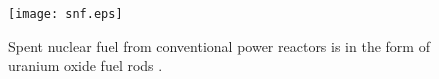 \begin{figure}[htb!]
  \begin{center}
    \texttt{[image: snf.eps]}
  \end{center}
  \caption{Spent nuclear fuel from conventional power reactors is in the form of 
    uranium oxide fuel rods \cite{something}.}
  \label{fig:snf}
\end{figure}
